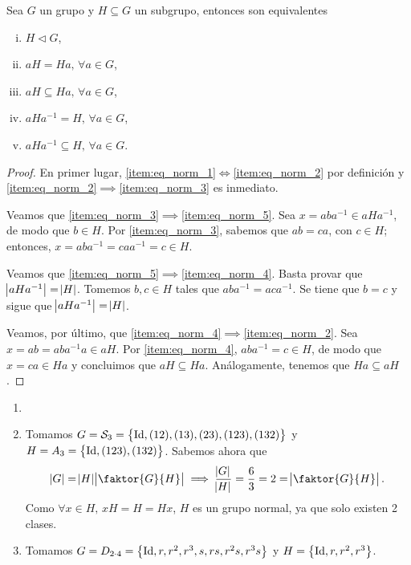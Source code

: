 \begin{prop}
    Sea $G$ un grupo y $H \subseteq G$ un subgrupo, entonces son equivalentes
    \begin{enumerate}[(i)]
        \item\label{item:eq_norm_1} $H \triangleleft G$,
        \item\label{item:eq_norm_2} $aH = Ha, \, \forall a \in G$,
        \item\label{item:eq_norm_3} $aH \subseteq Ha, \, \forall a \in G$,
        \item\label{item:eq_norm_4} $aHa^{-1} = H, \, \forall a \in G$,
        \item\label{item:eq_norm_5} $aHa^{-1} \subseteq H, \, \forall a \in G$.
    \end{enumerate}
\end{prop}

\begin{proof}
    En primer lugar, \ref{item:eq_norm_1}$\iff$\ref{item:eq_norm_2} por definición y \ref{item:eq_norm_2}$\implies$\ref{item:eq_norm_3} es inmediato.
    
    \noindent Veamos que \ref{item:eq_norm_3}$\implies$\ref{item:eq_norm_5}. Sea $x=aba^{-1}\in aHa^{-1}$, de modo que $b\in H$. Por \ref{item:eq_norm_3}, sabemos que $ab=ca$, con $c\in H$; entonces, $x=aba^{-1}=caa^{-1}=c\in H$.
    
    \noindent Veamos que \ref{item:eq_norm_5}$\implies$\ref{item:eq_norm_4}. Basta provar que $\abs{aHa^{-1}}=\abs{H}$. Tomemos $b, c\in H$ tales que $aba^{-1}=aca^{-1}$. Se tiene que $b=c$ y sigue que $\abs{aHa^{-1}}=\abs{H}$.
    
    \noindent Veamos, por último, que \ref{item:eq_norm_4}$\implies$\ref{item:eq_norm_2}. Sea $x=ab=aba^{-1}a\in aH$. Por \ref{item:eq_norm_4}, $aba^{-1}=c\in H$, de modo que $x=ca\in Ha$ y concluimos que $aH\subseteq Ha$. Análogamente, tenemos que $Ha\subseteq aH$.
\end{proof}

\begin{example}
    \begin{enumerate}[1.]
        \item[]
        \item Tomamos $G = \mathcal{S}_3 = \left\{\operatorname{Id}, (12), (13), (23), (123), (132)\right\}$ y
            $H = A_3 = \left\{\operatorname{Id}, (123), (132)\right\}$. Sabemos ahora que
            \[
                \abs{G} = \abs{H}\abs{\faktor{G}{H}} \implies
                \frac{\abs{G}}{\abs{H}} = \frac{6}{3} = 2 = \abs{\faktor{G}{H}}.
            \]
            Como $\forall x \in H, \, xH = H = Hx$, $H$ es un grupo normal, ya que solo existen 2 clases.
        \item Tomamos $G = D_{2 \cdot 4} = \left\{\operatorname{Id}, r, r^2, r^3, s, rs, r^2s, r^3s\right\}$ y
            $H = \left\{ \operatorname{Id}, r, r^2, r^3\right\}$.
    \end{enumerate}
\end{example}


